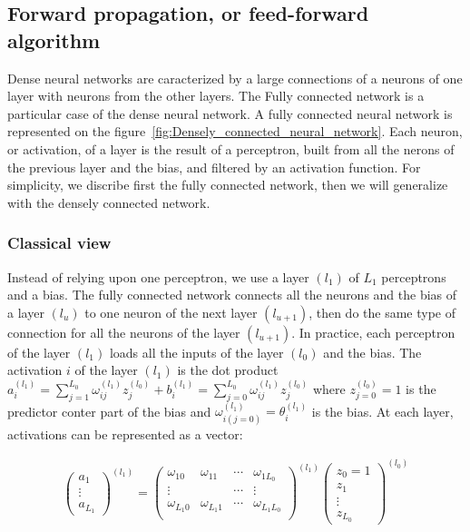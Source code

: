 \documentclass[final, paper=letter,5p,times,twocolumn]{elsarticle}
\begin{document}
\subsection{Forward propagation, or feed-forward algorithm}
Dense neural networks are caracterized by a large connections of a neurons of one layer with neurons from the other layers. The Fully connected network is a particular case of the dense neural network. A fully connected neural network is represented on the figure~\ref{fig:Densely_connected_neural_network}. Each neuron, or activation, of a layer is the result of a perceptron, built from all the nerons of the previous layer and the bias, and filtered by an activation function. For simplicity, we discribe first the fully connected network, then we will generalize with the densely connected network.

\subsubsection{Classical view}
Instead of relying upon one perceptron, we use a layer $(l_{1})$ of $L_{1}$ perceptrons and a bias. The fully connected network connects all the neurons and the bias of a layer $(l_{u})$ to one neuron of the next layer $(l_{u+1})$, then do the same type of connection for all the neurons of the layer $(l_{u+1})$. In practice, each perceptron of the layer $(l_{1})$ loads all the inputs of the layer $(l_{0})$ and the bias. The activation $i$ of the layer $(l_{1})$ is the dot product $a^{(l_{1})}_{i} = \sum_{j=1}^{L_{0}} \omega_{ij}^{(l_{1})} z^{(l_{0})}_{j} + b_{i}^{(l_{1})} = \sum_{j=0}^{L_{0}} \omega_{ij}^{(l_{1})} z^{(l_{0})}_{j}$ where $z^{(l_{0})}_{j = 0} = 1$ is the predictor conter part of the bias and $\omega^{(l_{1})}_{i(j = 0)} = \theta^{(l_{1})}_{i}$ is the bias. At each layer, activations can be represented as a vector:

\begin{eqnarray*}
  \left(
  \begin{array}{c}
    a_{1} \\
    \vdots \\
    a_{L_{1}}
  \end{array}
  \right)^{(l_{1})} = \left(
  \begin{array}{cccc}
    \omega_{10} & \omega_{11} & \cdots & \omega_{1L_{0}} \\
    \vdots     &            & \cdots & \vdots \\
    \omega_{L_{1}0} & \omega_{L_{1}1} & \cdots & \omega_{L_{1}L_{0}} \\
  \end{array}
  \right)^{(l_{1})}  \left(
  \begin{array}{c}
    z_{0} = 1 \\
    z_{1} \\
    \vdots \\
    z_{L_{0}} 
  \end{array}
  \right)^{(l_{0})}
\end{eqnarray*}
\end{document}
